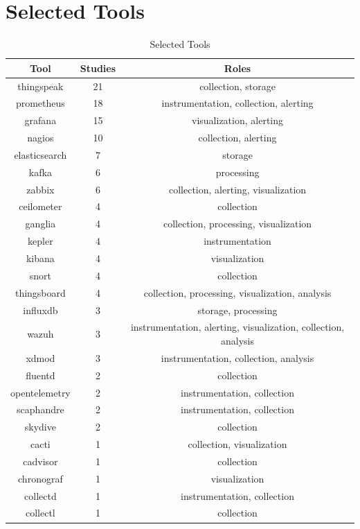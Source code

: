 \documentclass[sigconf]{acmart}
\begin{document}
\section{Selected Tools}
\begin{table}[!htbp]
  \caption{Selected Tools}
  \label{table-selected-tools}
  \centering

  \begin{tabular}{c c c}
  \hline
  \textbf{Tool} & \textbf{Studies} & \textbf{Roles} \\
  \hline
  thingspeak & 21 & collection, storage \\
  prometheus & 18 & instrumentation, collection, alerting \\
  grafana & 15 & visualization, alerting \\
  nagios & 10 & collection, alerting \\
  elasticsearch & 7 & storage \\
  kafka & 6 & processing \\
  zabbix & 6 & collection, alerting, visualization \\
  ceilometer & 4 & collection \\
  ganglia & 4 & collection, processing, visualization \\
  kepler & 4 & instrumentation \\
  kibana & 4 & visualization \\
  snort & 4 & collection \\
  thingsboard & 4 & collection, processing, visualization, analysis \\
  influxdb & 3 & storage, processing \\
  wazuh & 3 & instrumentation, alerting, visualization, collection,
  analysis \\
  xdmod & 3 & instrumentation, collection, analysis \\
  fluentd & 2 & collection \\
  opentelemetry & 2 & instrumentation, collection \\
  scaphandre & 2 & instrumentation, collection \\
  skydive & 2 & collection \\
  cacti & 1 & collection, visualization \\
  cadvisor & 1 & collection \\
  chronograf & 1 & visualization \\
  collectd & 1 & instrumentation, collection \\
  collectl & 1 & collection \\

\end{tabular}
\end{table}
\end{document}
